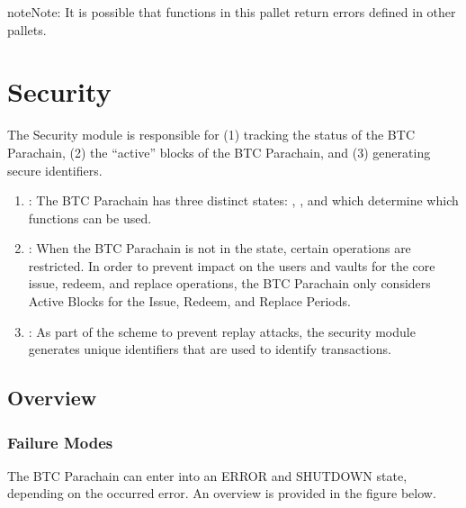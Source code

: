 \documentclass[a4paper,10pt,english]{sphinxmanual}
\begin{document}
\begin{sphinxadmonition}{note}{Note:}
It is possible that functions in this pallet return errors defined in other pallets.
\end{sphinxadmonition}


\chapter{Security}
\label{\detokenize{spec/security:security}}\label{\detokenize{spec/security:id1}}\label{\detokenize{spec/security::doc}}
The Security module is responsible for (1) tracking the status of the BTC Parachain, (2) the “active” blocks of the BTC Parachain, and (3) generating secure identifiers.
\begin{enumerate}
%
\item {} 
: The BTC Parachain has three distinct states: , , and  which determine which functions can be used.

\item {} 
: When the BTC Parachain is not in the  state, certain operations are restricted. In order to prevent impact on the users and vaults for the core issue, redeem, and replace operations, the BTC Parachain only considers Active Blocks for the Issue, Redeem, and Replace Periods.

\item {} 
: As part of the {\hyperref[\detokenize{security_performance/security-analysis:op-return}]{}} scheme to prevent replay attacks, the security module generates unique identifiers that are used to identify transactions.

\end{enumerate}


\section{Overview}
\label{\detokenize{spec/security:overview}}

\subsection{Failure Modes}
\label{\detokenize{spec/security:failure-modes}}
The BTC Parachain can enter into an ERROR and SHUTDOWN state, depending on the occurred error.
An overview is provided in the figure below.
\end{document}
